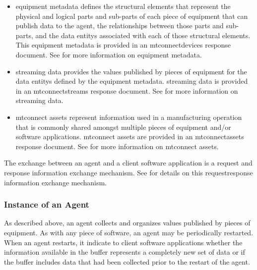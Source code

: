 \documentclass{mtconnect}	%
\begin{document}
\begin{itemize}

\item \gls{equipment metadata} defines the \glspl{structural element} that represent the physical and logical parts and sub-parts of each piece of equipment that can publish data to the \gls{agent}, the relationships between those parts and sub-parts, and the \glspl{data entity} associated with each of those \glspl{structural element}.  This \gls{equipment metadata} is provided in an \gls{mtconnectdevices response document}. See  for more information on \gls{equipment metadata}.

\item \gls{streaming data} provides the values published by pieces of equipment for the \glspl{data entity} defined by the \gls{equipment metadata}.  \gls{streaming data} is provided in an \gls{mtconnectstreams response document}.  See  for more information on \gls{streaming data}.

\item \glspl{mtconnect asset} represent information used in a manufacturing operation that is commonly shared amongst multiple pieces of equipment and/or software applications.  \glspl{mtconnect asset} are provided in an \gls{mtconnectassets response document}.  See  for more information on \glspl{mtconnect asset}.

\end{itemize}

The exchange between an \gls{agent} and a client software application is a \gls{request} and \gls{response} information exchange mechanism.  See  for details on this \gls{requestresponse} information exchange mechanism.

\subsubsection{Instance of an Agent}
\label{sec:Instance of an Agent}

As described above, an \gls{agent} collects and organizes values published by pieces of equipment.  As with any piece of software, an \gls{agent} may be periodically restarted.  When an \gls{agent} restarts, it \MUST indicate to client software applications whether the information available in the \gls{buffer} represents a completely new set of data or if the \gls{buffer} includes data that had been collected prior to the restart of the \gls{agent}.
\end{document}
